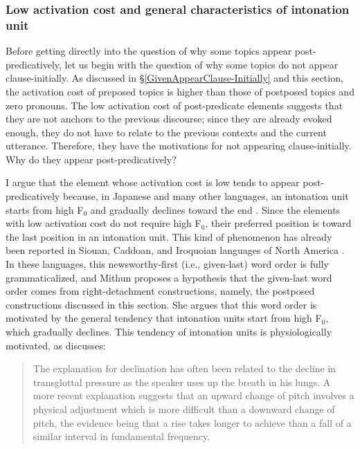\subsubsection{Low activation cost and general characteristics of intonation unit}\label{WO:PostP:Motivations:IU}

Before getting directly into the question of
why some topics appear post-pred\-i\-cat\-ively, %
let us begin with the question of why some topics do not appear clause-initially.
As discussed in \S \ref{GivenAppearClause-Initially} and this section,
the activation cost of preposed topics is higher than
those of postposed topics and zero pronouns.
The low activation cost of post-predicate elements suggests that
they are not anchors to the previous discourse;
since they are already evoked enough,
they do not have to relate to the previous contexts and the current utterance.
Therefore, they have the motivations for not appearing clause-initially.
Why do they appear post-predicatively?

I argue that the element whose activation cost is low tends to appear post-predicatively
because, in Japanese and many other languages,
an intonation unit starts from high F$_{0}$ and gradually declines toward the end 
\cite{libermanpierrehumbert84,cruttenden86,duboisetal93,chafe94,prieto96,truckenbrodt04,denetal10}.
Since the elements with low activation cost do not require high F$_{0}$,
their preferred position is toward the last position in an intonation unit.
This kind of phenomenon has already been reported in Siouan, Caddoan, and Iroquoian languages of North America \cite{mithun95}.
In these languages,
this newsworthy-first (i.e., given-last) word order is fully grammaticalized, and Mithun proposes a hypothesis that the given-last word order comes from right-detachment constructions, namely, the postposed constructions discussed in this section.
She argues that this word order is motivated by the general tendency that intonation units start from high F$_{0}$, which gradually declines.
This tendency of intonation units is physiologically motivated,
as  discusses:
%
\begin{quote}
The explanation for declination has often been related to the decline in transglottal pressure as the speaker uses up the breath in his lungs.
A more recent explanation suggests that an upward change of pitch involves a physical adjustment which is more difficult than a downward change of pitch,
the evidence being that a rise takes longer to achieve than a fall of a similar interval in fundamental frequency.
\cite[][168]{cruttenden86}
\end{quote}
%

